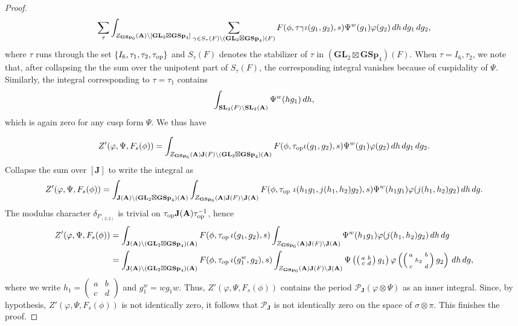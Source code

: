 \documentclass[11pt, reqno]{amsart}
\theoremstyle{plain}
\theoremstyle{definition}
\theoremstyle{remark}
\theoremstyle{plain}
\def\SL{{\mathbf{SL}}}
\def\A{{\bf A}}
\def\GSp{{\mathbf{GSp}}}
\def\GL{\mathbf{GL}}
\begin{document}
\begin{proof}
\begin{align*}
    \sum_{\tau}\int_{Z_{\GSp_6}(\A)\backslash [\GL_2\boxtimes \GSp_4]} \sum_{\gamma \in S_\tau(F) \backslash (\GL_2\boxtimes \GSp_4)(F) } F(\phi, \tau \gamma \iota (g_1,g_2) , s) \Psi^w( g_1 ) \varphi(g_2) \, d h \, dg_1\,dg_2,
\end{align*}
where $\tau$ runs through the set $\{I_6, \tau_1, \tau_2, \tau_{\rm op} \}$ and $S_\tau(F)$ denotes the stabilizer of $\tau$ in $\left(\GL_2\boxtimes\GSp_4\right)(F)$. When $\tau = I_6, \tau_2$, we note that, after collapsing the the sum over the unipotent part of $S_\tau(F)$, the corresponding integral vanishes because of cuspidality of $\Psi$. Similarly, the integral corresponding to $\tau = \tau_1$ contains 
$$\int_{\SL_2(F)\backslash \SL_2(\A)} \Psi^w(h g_1)\, dh ,$$
which is again zero for any cusp form $\Psi$. We thus have 

$$Z'(\varphi, \Psi, F_s(\phi)) =  \int_{Z_{\GSp_6}(\A) \mathbf{J}(F)\backslash (\GL_2\boxtimes \GSp_4)(\A)} F(\phi, \tau_{\rm op}\iota (g_1,g_2) , s) \Psi^w( g_1 ) \varphi(g_2) \, d h \, dg_1\,dg_2.$$
Collapse the sum over $[\mathbf{J}]$ to write the integral as
\small
$$Z'(\varphi, \Psi, F_s(\phi)) =  \int_{\mathbf{J}(\A)\backslash (\GL_2\boxtimes \GSp_4)(\A)} \int_{Z_{\GSp_6}(\A) \mathbf{J}(F)\backslash \mathbf{J}(\A)}F(\phi, \tau_{\rm op} \,\, \iota (h_1g_1,j(h_1,h_2)g_2) , s) \Psi^w( h_1 g_1 ) \varphi(j(h_1,h_2)g_2) \, d h \, dg.$$
\normalsize
The modulus character $\delta_{P_{(2,2)}}$ is trivial on $\tau_{\rm op} \mathbf{J}(\A) \tau_{\rm op}^{-1}$, hence 
\small
\begin{align*}
    Z'(\varphi, \Psi, F_s(\phi)) &=  \int_{\mathbf{J}(\A)\backslash (\GL_2\boxtimes \GSp_4)(\A)}F(\phi, \tau_{\rm op} \, \iota (g_1,g_2) , s)  \int_{Z_{\GSp_6}(\A) \mathbf{J}(F)\backslash \mathbf{J}(\A)}\Psi^w( h_1 g_1 ) \varphi(j(h_1,h_2)g_2) \, d h \, dg \\ 
    &=  \int_{\mathbf{J}(\A)\backslash (\GL_2\boxtimes \GSp_4)(\A)}F(\phi, \tau_{\rm op} \, \iota (g_1^w,g_2) , s)  \int_{Z_{\GSp_6}(\A) \mathbf{J}(F)\backslash \mathbf{J}(\A)}  \Psi\left(\left(\begin{smallmatrix}
    a &b\\ c &d
\end{smallmatrix}\right) g_1\right) \varphi\left( \left(\begin{smallmatrix}
    a& &b\\ &h_2& \\ c& &d
\end{smallmatrix}\right) g_2 \right ) \, d h \, dg,
\end{align*}
\normalsize
where we write $h_1 = \left(\begin{smallmatrix}
    a &b\\ c &d
\end{smallmatrix}\right)$ and $g_1^w = w g_1 w$. Thus, $Z'(\varphi, \Psi, F_s(\phi))$ contains the period $\mathcal{P}_{\mathbf{J}}(\varphi \otimes \Psi)$ as an inner integral. Since, by hypothesis,  $ Z'(\varphi, \Psi, F_s(\phi))$ is not identically zero, it follows that $\mathcal{P}_{\mathbf{J}}$ is not identically zero on the space of $\sigma \otimes \pi$. This finishes the proof.  
\end{proof}
\end{document}
